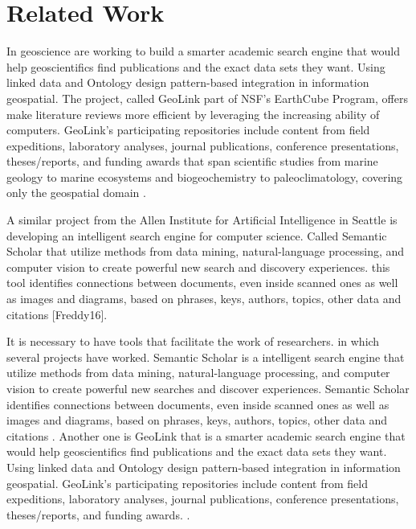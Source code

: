 \documentclass[11pt]{article}
\begin{document}
\section{Related Work}
\label{label:relatedwork}

In geoscience are working to build a smarter academic search engine that would help geoscientifics find publications and the exact data sets they want. Using linked data and Ontology design pattern-based integration in information geospatial. The project, called GeoLink part of NSF's EarthCube Program, offers  make literature reviews more efficient by leveraging the increasing ability of computers. GeoLink's participating repositories include content from field expeditions, laboratory analyses, journal publications, conference presentations, theses/reports, and funding awards that span scientific studies from marine geology to marine ecosystems and biogeochemistry to paleoclimatology, covering only the geospatial domain \cite{Krisnadhi01} \cite{Krisnadhi02}.

A similar project from the Allen Institute for Artificial Intelligence in Seattle is developing an intelligent search engine for computer science. Called Semantic Scholar that  utilize methods from data mining, natural-language processing, and computer vision to create powerful new search and discovery experiences. this tool identifies connections between documents, even inside scanned ones as well as images and diagrams, based on phrases, keys, authors, topics, other data and citations [Freddy16]. 

It is necessary to have tools that facilitate the work of researchers. in which several projects have worked. Semantic Scholar is a intelligent search engine that  utilize methods from data mining, natural-language processing, and computer vision to create powerful new searches and discover experiences. Semantic Scholar identifies connections between documents, even inside scanned ones as well as images and diagrams, based on phrases, keys, authors, topics, other data and citations \cite{semanticscholar}. Another one is GeoLink that is a smarter academic search engine that would help geoscientifics find publications and the exact data sets they want. Using linked data and Ontology design pattern-based integration in information geospatial. GeoLink's participating repositories include content from field expeditions, laboratory analyses, journal publications, conference presentations, theses/reports, and funding awards. \cite{Krisnadhi01} \cite{Krisnadhi02}.
\end{document}
